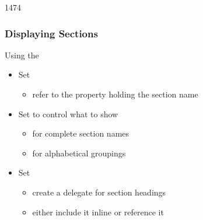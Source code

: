 \begin{slide}{1474}\frametitle{Displaying Sections}

Using the 

\begin{itemize}
\item Set 
  \begin{itemize}
  \item refer to the  property holding the section name
  \end{itemize}
\item Set  to control what to show
  \begin{itemize}
  \item {} for complete section names
  \item {} for alphabetical groupings
  \end{itemize}
\item Set 
  \begin{itemize}
  \item create a delegate for section headings
  \item either include it inline or reference it
  \end{itemize}
\end{itemize}

\end{slide}


